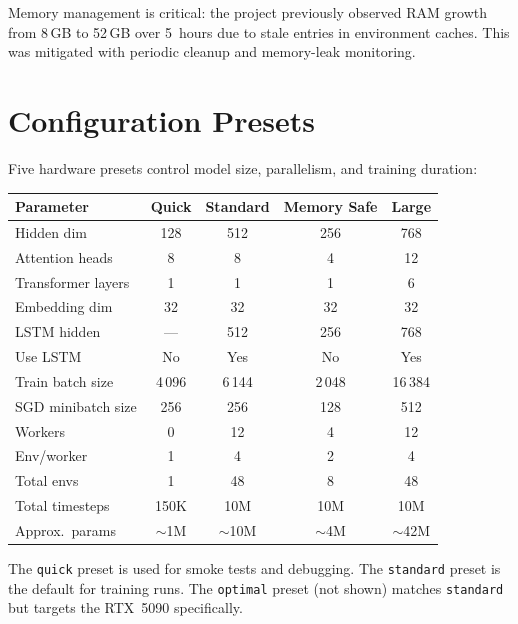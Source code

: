 Memory management is critical: the project previously observed RAM growth from
8\,GB to 52\,GB over 5~hours due to stale entries in environment caches.  This
was mitigated with periodic cleanup and memory-leak monitoring.

\section{Configuration Presets}

Five hardware presets control model size, parallelism, and training duration:

\begin{center}
\small
\begin{tabularx}{\textwidth}{l c c c c}
  \toprule
  \textbf{Parameter} & \textbf{Quick} & \textbf{Standard} & \textbf{Memory Safe} & \textbf{Large} \\
  \midrule
  Hidden dim              & 128   & 512   & 256   & 768   \\
  Attention heads         & 8     & 8     & 4     & 12    \\
  Transformer layers      & 1     & 1     & 1     & 6     \\
  Embedding dim           & 32    & 32    & 32    & 32    \\
  LSTM hidden             & ---   & 512   & 256   & 768   \\
  Use LSTM                & No    & Yes   & No    & Yes   \\
  Train batch size        & 4\,096  & 6\,144  & 2\,048  & 16\,384 \\
  SGD minibatch size      & 256   & 256   & 128   & 512   \\
  Workers                 & 0     & 12    & 4     & 12    \\
  Env/worker              & 1     & 4     & 2     & 4     \\
  Total envs              & 1     & 48    & 8     & 48    \\
  Total timesteps         & 150K  & 10M   & 10M   & 10M   \\
  Approx.\ params         & $\sim$1M & $\sim$10M & $\sim$4M & $\sim$42M \\
  \bottomrule
\end{tabularx}
\end{center}

The \texttt{quick} preset is used for smoke tests and debugging.  The
\texttt{standard} preset is the default for training runs.  The
\texttt{optimal} preset (not shown) matches \texttt{standard} but targets the
RTX~5090 specifically.

